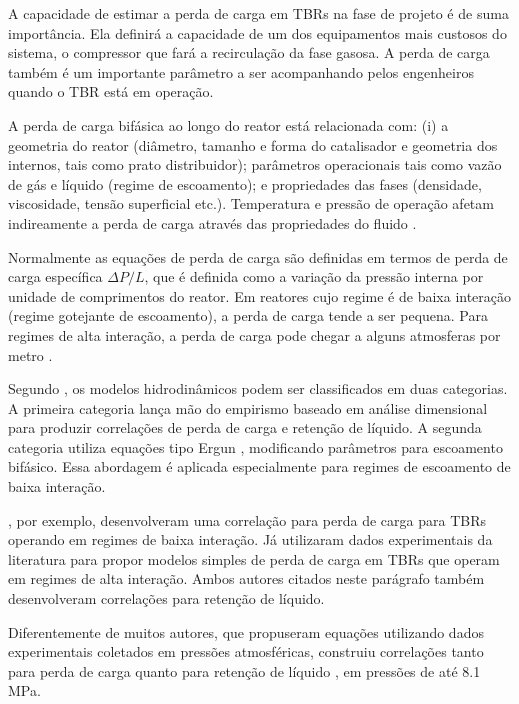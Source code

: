 A capacidade de estimar a perda de carga em TBRs na fase de projeto é de suma
importância. Ela definirá a capacidade de um dos equipamentos mais custosos do
sistema, o compressor que fará a recirculação da fase gasosa. A perda de carga
também é um importante parâmetro a ser acompanhando pelos engenheiros quando o
TBR está em operação.

A perda de carga bifásica ao longo do reator está relacionada com: (i) a
geometria do reator (diâmetro, tamanho e forma do catalisador e geometria dos
internos, tais como prato distribuidor); parâmetros operacionais tais como vazão
de gás e líquido (regime de escoamento); e propriedades das fases (densidade,
viscosidade, tensão superficial etc.). Temperatura e pressão de operação afetam
indireamente a perda de carga através das propriedades do fluido
\cite{Ranade2011}.

Normalmente as equações de perda de carga são definidas em termos de perda de
carga específica $\Delta P/L$, que é definida como a variação da pressão interna
por unidade de comprimentos do reator. Em reatores cujo regime é de baixa
interação (regime gotejante de escoamento), a perda de carga tende a ser
pequena. Para regimes de alta interação, a perda de carga pode chegar a alguns
atmosferas por metro \cite{Benkrid1997}.


Segundo , os modelos hidrodinâmicos podem ser
classificados em duas categorias. A primeira categoria lança mão do empirismo
baseado em análise dimensional para produzir correlações de perda de carga e
retenção de líquido. A segunda categoria utiliza equações tipo Ergun
, modificando parâmetros para escoamento bifásico.
Essa abordagem é aplicada especialmente para regimes de escoamento de baixa
interação.

, por exemplo, desenvolveram uma correlação para perda
de carga para TBRs operando em regimes de baixa interação. Já
 utilizaram dados experimentais  da literatura para propor modelos
simples de perda de carga em TBRs que operam em regimes de alta
interação. Ambos autores citados neste parágrafo também desenvolveram
correlações para retenção de líquido.

Diferentemente de muitos autores, que propuseram equações utilizando dados
experimentais coletados em pressões atmosféricas, 
construiu correlações tanto para perda de carga quanto para retenção de líquido
, em pressões de até 8.1 MPa.

